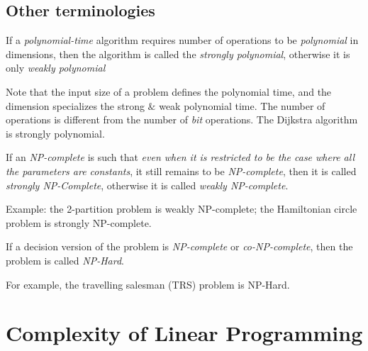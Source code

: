 \subsection{Other terminologies}

\begin{definition}
If a \emph{polynomial-time} algorithm requires number of operations to be \emph{polynomial} in dimensions, then the algorithm is called the \emph{strongly polynomial}, otherwise it is only \emph{weakly polynomial}
\end{definition}
\begin{remark}
Note that the input size of a problem defines the polynomial time, and the dimension specializes the strong $\&$ weak polynomial time.
The number of operations is different from the number of \emph{bit} operations.
The Dijkstra algorithm is strongly polynomial.
\end{remark}

\begin{definition}
If an \emph{NP-complete} is such that
\emph{even when it is restricted to be the case where all the parameters are constants}, it still remains to be \emph{NP-complete}, then it is called \emph{strongly NP-Complete}, otherwise it is called \emph{weakly NP-complete}.
\end{definition}

Example: the 2-partition problem is weakly NP-complete; the Hamiltonian circle problem is strongly NP-complete.

\begin{definition}
If a decision version of the problem is \emph{NP-complete} or \emph{co-NP-complete}, then the problem is called \emph{NP-Hard}.
\end{definition}

For example, the travelling salesman (TRS) problem is NP-Hard.

\section{Complexity of Linear Programming}

